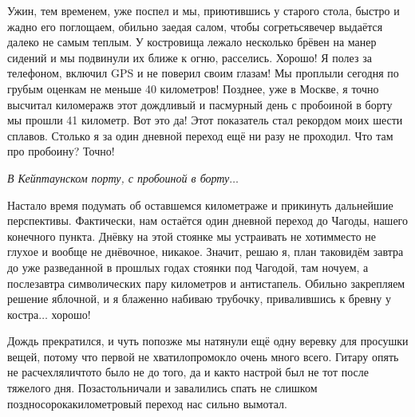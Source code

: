 Ужин, тем временем, уже поспел и мы, приютившись у старого стола, быстро и жадно его поглощаем, обильно заедая салом, чтобы согреться\mdash вечер выдаётся далеко не самым теплым. У костровища лежало несколько брёвен на манер сидений и мы подвинули их ближе к огню, расселись. Хорошо! Я полез за телефоном, включил GPS и не поверил своим глазам! Мы проплыли сегодня по грубым оценкам не меньше 40 километров! Позднее, уже в Москве, я точно высчитал киломераж\mdash в этот дождливый и пасмурный день с пробоиной в борту мы прошли 41 километр. Вот это да! Этот показатель стал рекордом моих шести сплавов. Столько я за один дневной переход ещё ни разу не проходил. Что там про пробоину? Точно! 

\vspace{0.1cm}
\noindent\textit{%
	\hspace*{1.0cm}В Кейптаунском порту, с пробоиной в борту$\ldots$
}
\vspace{0.1cm}

Настало время подумать об оставшемся километраже и прикинуть дальнейшие перспективы. Фактически, нам остаётся один дневной переход до Чагоды, нашего конечного пункта. Днёвку на этой стоянке мы устраивать не хотим\mdash место не глухое и вообще не днёвочное, никакое. Значит, решаю я, план таков\mdash идём завтра до уже разведанной в прошлых годах стоянки под Чагодой, там ночуем, а послезавтра символических пару километров и антистапель. Обильно закрепляем решение яблочной, и я блаженно набиваю трубочку, привалившись к бревну у костра$\ldots$ хорошо! 

Дождь прекратился, и чуть попозже мы натянули ещё одну веревку для просушки вещей, потому что первой не хватило\mdash промокло очень много всего. Гитару опять не расчехляли\mdash что\sdash то было не до того, да и как\sdash то настрой был не тот после тяжелого дня. Позастольничали и завалились спать не слишком поздно\mdash сорокакилометровый переход нас сильно вымотал.

\begin{center}
\end{center}
